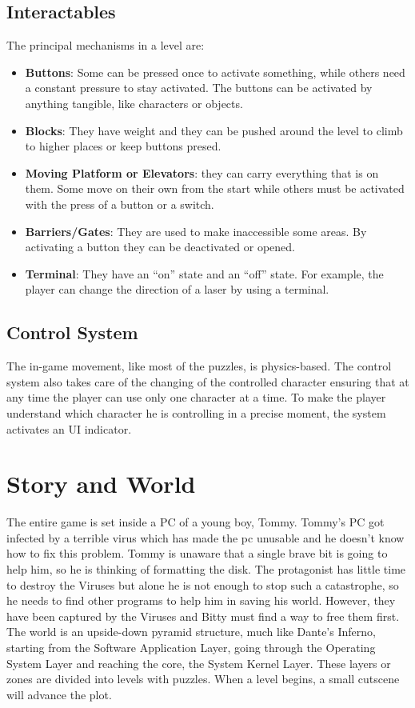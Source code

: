 \documentclass[12pt, a4paper]{report}
\begin{document}
\section*{Interactables}
The principal mechanisms in a level are:
\begin{itemize}
	\item \textbf{Buttons}: Some can be pressed once to activate something, while others need a constant pressure to stay activated. The buttons can be activated by anything tangible, like characters or objects.
	\item \textbf{Blocks}: They have weight and they can be pushed around the level to climb to higher places or keep buttons presed.
	\item \textbf{Moving Platform or Elevators}: they can carry everything that is on them. Some move on their own from the start while others must be activated with the press of a button or a switch.
	\item \textbf{Barriers/Gates}: They are used to make inaccessible some areas. By activating a button they can be deactivated or opened.
	\item \textbf{Terminal}: They have an “on” state and an “off” state. For example, the player can change the direction of a laser by using a terminal.
\end{itemize}

\section*{Control System}
The in-game movement, like most of the puzzles, is physics-based. The control system also takes care of the changing of the controlled character ensuring that at any time the player can use only one character at a time. To make the player understand which character he is controlling in a precise moment, the system activates an UI indicator.



\chapter{Story and World}
The entire game is set inside a PC of a young boy, Tommy. Tommy’s PC got infected by a terrible virus which has made the pc unusable and he doesn’t know how to fix this problem. Tommy is unaware that a single brave bit is going to help him, so he is thinking of formatting the disk. The protagonist has little time to destroy the Viruses but alone he is not enough to stop such a catastrophe, so he needs to find other programs to help him in saving his world. However, they have been captured by the Viruses and Bitty must find a way to free them first.\\
The world is an upside-down pyramid structure, much like Dante’s Inferno, starting from the Software Application Layer, going through the Operating System Layer and reaching the core, the System Kernel Layer. These layers or zones are divided into levels with puzzles. When a level begins, a small cutscene will advance the plot.
\end{document}
